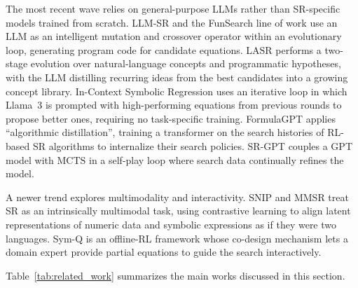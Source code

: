 The most recent wave relies on general-purpose LLMs rather than SR-specific models trained from scratch. LLM-SR \cite{shojaee_llm-sr_2024} and the FunSearch line of work \cite{ellenberg_generative_2025} use an LLM as an intelligent mutation and crossover operator within an evolutionary loop, generating program code for candidate equations. LASR \cite{grayeli2024symbolicregressionlearnedconcept} performs a two-stage evolution over natural-language concepts and programmatic hypotheses, with the LLM distilling recurring ideas from the best candidates into a growing concept library. In-Context Symbolic Regression \cite{merler_-context_2024} uses an iterative loop in which Llama~3 \cite{grattafiori2024llama3herdmodels} is prompted with high-performing equations from previous rounds to propose better ones, requiring no task-specific training. FormulaGPT \cite{li_generative_2024} applies ``algorithmic distillation'', training a transformer on the search histories of RL-based SR algorithms to internalize their search policies. SR-GPT \cite{li_discovering_2024} couples a GPT model with MCTS in a self-play loop where search data continually refines the model.

A newer trend explores multimodality and interactivity. SNIP \cite{meidani_snip_2023} and MMSR \cite{li_mmsr_2024} treat SR as an intrinsically multimodal task, using contrastive learning to align latent representations of numeric data and symbolic expressions as if they were two languages. Sym-Q \cite{tian_interactive_2025} is an offline-RL framework whose co-design mechanism lets a domain expert provide partial equations to guide the search interactively.

\vspace{0.5em}
Table~\ref{tab:related_work} summarizes the main works discussed in this section.

